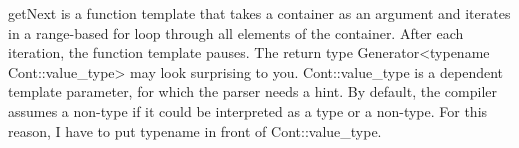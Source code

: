 getNext is a function template that takes a container as an argument and iterates in a range-based for loop through all elements of the container. After each iteration, the function template pauses. The return type Generator<typename Cont::value\_type> may look surprising to you. Cont::value\_type is a dependent template parameter, for which the parser needs a hint. By default, the compiler assumes a non-type if it could be interpreted as a type or a non-type. For this reason, I have to put typename in front of Cont::value\_type.















